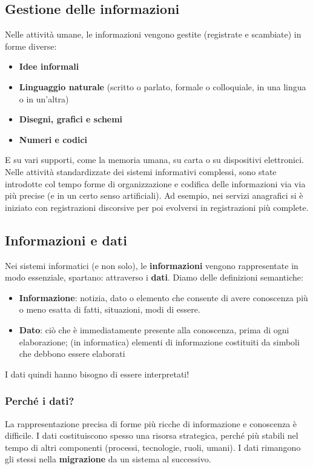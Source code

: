 \documentclass[12pt]{article}
\begin{document}
\subsection{Gestione delle informazioni}
Nelle attività umane, le informazioni vengono gestite (registrate e scambiate) in forme diverse:
\begin{itemize}
    \item \textbf{Idee informali}
    \item \textbf{Linguaggio naturale} (scritto o parlato, formale o colloquiale, in una lingua o in un'altra)
    \item \textbf{Disegni, grafici e schemi}
    \item \textbf{Numeri e codici}
\end{itemize}
E su vari supporti, come la memoria umana, su carta o su dispositivi elettronici.
Nelle attività standardizzate dei sistemi informativi complessi, sono state introdotte col tempo forme di organizzazione e codifica delle informazioni via via più precise (e in un certo senso artificiali).
Ad esempio, nei servizi anagrafici si è iniziato con registrazioni discorsive per poi evolversi in registrazioni più complete.
\subsection{Informazioni e dati}
Nei sistemi informatici (e non solo), le \textbf{informazioni} vengono rappresentate in modo essenziale, spartano: attraverso i \textbf{dati}.
Diamo delle definizioni semantiche:
\begin{itemize}
    \item \textbf{Informazione}: notizia, dato o elemento che consente di avere conoscenza più o meno esatta di fatti, situazioni, modi di essere.
    \item \textbf{Dato}: ciò che è immediatamente presente alla conoscenza, prima di ogni elaborazione; (in informatica) elementi di informazione costituiti da simboli che debbono essere elaborati
\end{itemize}
I dati quindi hanno bisogno di essere interpretati!
\subsubsection{Perché i dati?}
La rappresentazione precisa di forme più ricche di informazione e conoscenza è difficile.
I dati costituiscono spesso una risorsa strategica, perché più stabili nel tempo di altri componenti (processi, tecnologie, ruoli, umani).
I dati rimangono gli stessi nella \textbf{migrazione} da un sistema al successivo.
\end{document}
